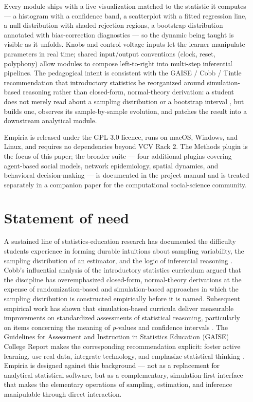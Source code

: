 Every module ships with a live visualization matched to the statistic it
computes --- a histogram with a confidence band, a scatterplot with a
fitted regression line, a null distribution with shaded rejection
regions, a bootstrap distribution annotated with bias-correction
diagnostics --- so the dynamic being taught is visible as it unfolds.
Knobs and control-voltage inputs let the learner manipulate parameters
in real time; shared input/output conventions (clock, reset, polyphony)
allow modules to compose left-to-right into multi-step inferential
pipelines. The pedagogical intent is consistent with the GAISE / Cobb /
Tintle recommendation \citep{cobb2007, gaise2016, tintle2014} that
introductory statistics be reorganized around simulation-based reasoning
rather than closed-form, normal-theory derivation: a student does not
merely read about a sampling distribution or a bootstrap interval
\citep{efron1979}, but builds one, observes its sample-by-sample
evolution, and patches the result into a downstream analytical module.

Empiria is released under the GPL-3.0 licence, runs on macOS, Windows,
and Linux, and requires no dependencies beyond VCV Rack 2. The Methods
plugin is the focus of this paper; the broader suite --- four additional
plugins covering agent-based social models, network epidemiology,
spatial dynamics, and behavioral decision-making --- is documented in
the project manual and is treated separately in a companion paper for
the computational social-science community.

\section{Statement of need}\label{statement-of-need}

A sustained line of statistics-education research has documented the
difficulty students experience in forming durable intuitions about
sampling variability, the sampling distribution of an estimator, and the
logic of inferential reasoning
\citep{chance2004, delmas2007, garfield2009}. Cobb's influential
analysis of the introductory statistics curriculum \citep{cobb2007}
argued that the discipline has overemphasized closed-form, normal-theory
derivations at the expense of randomization-based and simulation-based
approaches in which the sampling distribution is constructed empirically
before it is named. Subsequent empirical work has shown that
simulation-based curricula deliver measurable improvements on
standardized assessments of statistical reasoning, particularly on items
concerning the meaning of \emph{p}-values and confidence intervals
\citep{tintle2014}. The Guidelines for Assessment and Instruction in
Statistics Education (GAISE) College Report makes the corresponding
recommendation explicit: foster active learning, use real data,
integrate technology, and emphasize statistical thinking
\citep{gaise2016}. Empiria is designed against this background --- not
as a replacement for analytical statistical software, but as a
complementary, simulation-first interface that makes the elementary
operations of sampling, estimation, and inference manipulable through
direct interaction.

